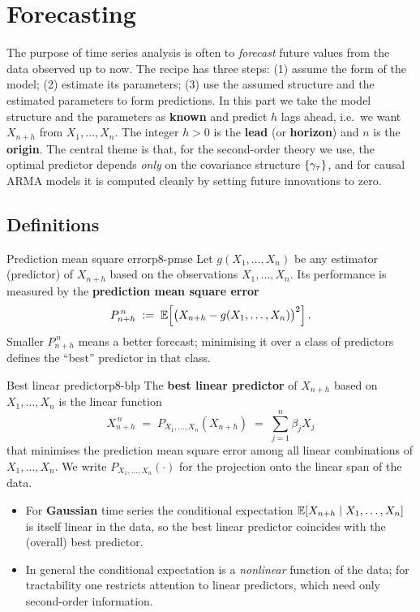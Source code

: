 \section{Forecasting}
\label{sec:forecasting}

The purpose of time series analysis is often to \emph{forecast} future values
from the data observed up to now. The recipe has three steps: (1) assume the
form of the model; (2) estimate its parameters; (3) use the assumed structure
and the estimated parameters to form predictions. In this part we take the
model structure and the parameters as \textbf{known} and predict $h$ lags
ahead, i.e.\ we want $X_{n+h}$ from $X_1,\dots,X_n$. The integer $h>0$ is the
\textbf{lead} (or \textbf{horizon}) and $n$ is the \textbf{origin}. The central
theme is that, for the second-order theory we use, the optimal predictor depends
\emph{only} on the covariance structure $\{\gamma_\tau\}$, and for causal ARMA
models it is computed cleanly by setting future innovations to zero.

\subsection{Definitions}

\begin{definition}{Prediction mean square error}{p8-pmse}
Let $g(X_1,\dots,X_n)$ be any estimator (predictor) of $X_{n+h}$ based on the
observations $X_1,\dots,X_n$. Its performance is measured by the
\textbf{prediction mean square error}
\[
P^{\,n}_{n+h}\;:=\;\mathbb{E}\!\left[\big(X_{n+h}-g(X_1,\dots,X_n)\big)^2\right].
\]
Smaller $P^{\,n}_{n+h}$ means a better forecast; minimising it over a class of
predictors defines the ``best'' predictor in that class.
\end{definition}

\begin{definition}{Best linear predictor}{p8-blp}
The \textbf{best linear predictor} of $X_{n+h}$ based on $X_1,\dots,X_n$ is the
linear function
\[
X^{\,n}_{n+h}\;=\;P_{X_1,\dots,X_n}(X_{n+h})\;=\;\sum_{j=1}^{n}\beta_j X_j
\]
that minimises the prediction mean square error among all linear combinations of
$X_1,\dots,X_n$. We write $P_{X_1,\dots,X_n}(\cdot)$ for the projection onto the
linear span of the data.
\begin{itemize}
  \item For \textbf{Gaussian} time series the conditional expectation
        $\mathbb{E}[X_{n+h}\mid X_1,\dots,X_n]$ is itself linear in the data, so the best
        linear predictor coincides with the (overall) best predictor.
  \item In general the conditional expectation is a \emph{nonlinear} function of
        the data; for tractability one restricts attention to linear predictors,
        which need only second-order information.
\end{itemize}
\end{definition}

